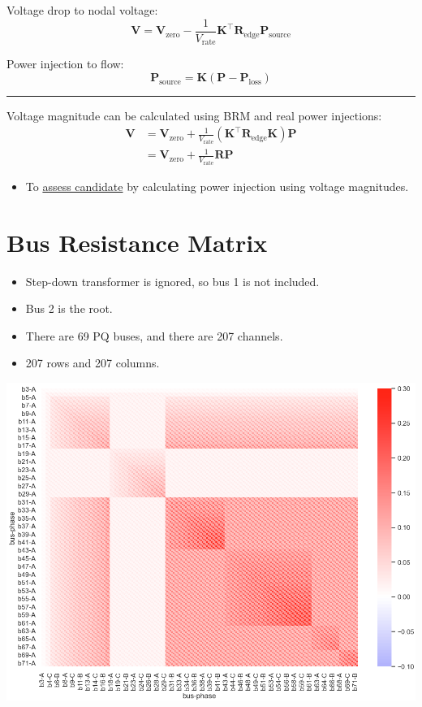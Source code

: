 \documentclass[
]{book}
\providecommand{\tightlist}{%
  \setlength{\itemsep}{0pt}\setlength{\parskip}{0pt}}
\begin{document}
Voltage drop to nodal voltage:
\[
\boldsymbol{V}
  = \boldsymbol{V}_\text{zero}
  - \frac{1}{V_\text{rate}} \boldsymbol{K}^{\top}
  \boldsymbol{R}_\text{edge} \boldsymbol{P}_\text{source}
\]

Power injection to flow:
\[
\boldsymbol{P}_\text{source}
  = \boldsymbol{K}
  \left(\boldsymbol{P} - \boldsymbol{P}_\text{loss} \right)
\]

\begin{center}\rule{0.5\linewidth}{0.5pt}\end{center}

Voltage magnitude can be calculated using BRM and real power injections:
\[ \begin{aligned}
  \boldsymbol{V} &= \boldsymbol{V}_\text{zero} + \frac{1}{V_\text{rate}}
    \left(
      \boldsymbol{K}^{\top} \boldsymbol{R}_\text{edge} \boldsymbol{K}
    \right) \boldsymbol{P} \\
  {} &= \boldsymbol{V}_\text{zero}
      + \frac{1}{V_\text{rate}} \boldsymbol{R} \boldsymbol{P}
\end{aligned} \]

\begin{itemize}
\tightlist
\item
  To \protect\hyperlink{assessment}{assess candidate} by calculating power injection using
  voltage magnitudes.
\end{itemize}

\hypertarget{BRM}{%
\section{Bus Resistance Matrix}\label{BRM}}

\begin{itemize}
\tightlist
\item
  Step-down transformer is ignored, so bus 1 is not included.
\item
  Bus 2 is the root.
\item
  There are 69 PQ buses, and there are 207 channels.
\item
  207 rows and 207 columns.
\end{itemize}

\begin{center}\includegraphics{Pictures/figHeatmapBRM} \end{center}
\end{document}
